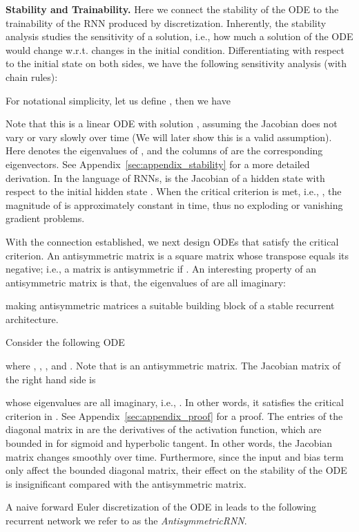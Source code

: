 \textbf{Stability and Trainability.} Here we connect the stability of the ODE to the trainability of the RNN produced by discretization. 
Inherently, the stability analysis studies the sensitivity of a solution, i.e., how much a solution of the ODE would change w.r.t. changes in the initial condition. 
Differentiating  with respect to the initial state  on both sides, we have the following sensitivity analysis (with chain rules):

For notational simplicity, let us define , then we have

Note that this is a linear ODE with solution , assuming the Jacobian  does not vary or vary slowly over time (We will later show this is a valid assumption). Here  denotes the eigenvalues of , and the columns of  are the corresponding eigenvectors. See Appendix~\ref{sec:appendix_stability} for a more detailed derivation.
In the language of RNNs,  is 
the Jacobian of a hidden state  with respect to the initial hidden state .
When the critical criterion is met, i.e., , the magnitude of  is approximately constant in time, thus no exploding or vanishing gradient problems.



With the connection established, we next design ODEs that satisfy the critical criterion. An antisymmetric matrix is a square matrix whose transpose equals its negative;
i.e., a matrix  is antisymmetric if .
An interesting property of an antisymmetric matrix  is that, the eigenvalues of  are all imaginary: 

making antisymmetric matrices a suitable building block of a stable recurrent architecture.


Consider the following ODE

where
,
,
,  and .
Note that  is an antisymmetric matrix.
The Jacobian matrix of the right hand side is

whose eigenvalues are all imaginary, i.e., 
.
In other words, it satisfies the critical criterion in .
See Appendix~\ref{sec:appendix_proof} for a proof.
The entries of the diagonal matrix in  are the derivatives of the activation function, which are bounded in  for sigmoid and hyperbolic tangent. 
In other words, the Jacobian matrix  changes smoothly over time.
Furthermore, since the input and bias term only affect the bounded diagonal matrix, their effect on the stability of the ODE is insignificant compared with the antisymmetric matrix.


A naive forward Euler discretization of the ODE in  leads to the following recurrent network
we refer to as the \textit{AntisymmetricRNN}.


